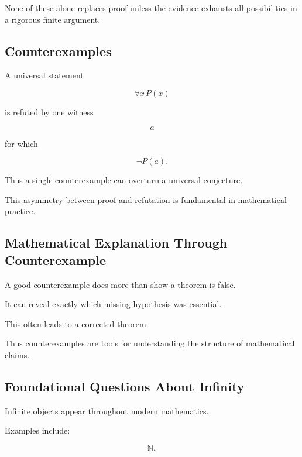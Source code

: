 None of these alone replaces proof unless the evidence exhausts all
possibilities in a rigorous finite argument.

\subsection{Counterexamples}
\label{subsec:philosophy-counterexamples}

A universal statement

\[
\forall x\,P(x)
\]

is refuted by one witness

\[
a
\]

for which

\[
\boxed{
\neg P(a).
}
\]

Thus a single counterexample can overturn a universal conjecture.

This asymmetry between proof and refutation is fundamental in mathematical
practice.

\subsection{Mathematical Explanation Through Counterexample}
\label{subsec:counterexample-explanation}

A good counterexample does more than show a theorem is false.

It can reveal exactly which missing hypothesis was essential.

This often leads to a corrected theorem.

Thus counterexamples are tools for understanding the structure of
mathematical claims.

\subsection{Foundational Questions About Infinity}
\label{subsec:foundational-infinity}

Infinite objects appear throughout modern mathematics.

Examples include:

\[
\boxed{
\mathbb{N},
}
\]

